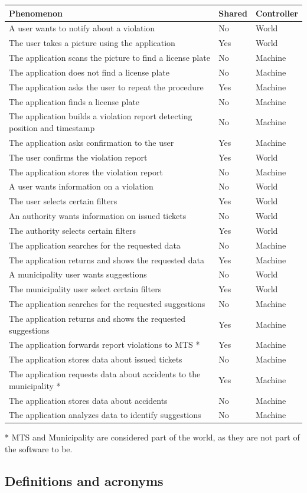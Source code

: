 \documentclass[a4paper]{article}
\begin{document}
\begin{table}[H]
\centering
\begin{tabularx}{\textwidth}{|X|l|l|}
\hline
Phenomenon & Shared & Controller\tabularnewline
\hline
A user wants to notify about a violation & No & World\tabularnewline
The user takes a picture using the application & Yes &
World\tabularnewline
The application scans the picture to find a license plate & No &
Machine\tabularnewline
The application does not find a license plate & No &
Machine\tabularnewline
The application asks the user to repeat the procedure & Yes &
Machine\tabularnewline
The application finds a license plate & No & Machine\tabularnewline
The application builds a violation report detecting position and
timestamp & No & Machine\tabularnewline
The application asks confirmation to the user & Yes &
Machine\tabularnewline
The user confirms the violation report & Yes & World\tabularnewline
The application stores the violation report & No &
Machine\tabularnewline
A user wants information on a violation & No & World\tabularnewline
The user selects certain filters & Yes & World\tabularnewline
An authority wants information on issued tickets & No &
World\tabularnewline
The authority selects certain filters & Yes & World\tabularnewline
The application searches for the requested data & No &
Machine\tabularnewline
The application returns and shows the requested data & Yes &
Machine\tabularnewline
A municipality user wants suggestions & No & World\tabularnewline
The municipality user select certain filters & Yes &
World\tabularnewline
The application searches for the requested suggestions & No &
Machine\tabularnewline
The application returns and shows the requested suggestions & Yes &
Machine\tabularnewline
The application forwards report violations to MTS * & Yes &
Machine\tabularnewline
The application stores data about issued tickets & No &
Machine\tabularnewline
The application requests data about accidents to the municipality * &
Yes & Machine\tabularnewline
The application stores data about accidents & No &
Machine\tabularnewline
The application analyzes data to identify suggestions & No &
Machine\tabularnewline
\hline
\end{tabularx}
\end{table}

* MTS and Municipality are considered part of the world, as they are not
part of the software to be.

\subsection{Definitions and acronyms}
\end{document}
